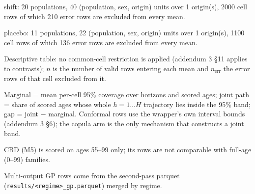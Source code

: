 {\begin{minipage}{\linewidth}
\noindent shift: 20 populations, 40 (population, sex, origin) units over 1 origin(s), 2000 cell rows of which 210 error rows are excluded from every mean.\par
\noindent placebo: 11 populations, 22 (population, sex, origin) units over 1 origin(s), 1100 cell rows of which 136 error rows are excluded from every mean.\par
\noindent Descriptive table: no common-cell restriction is applied (addendum 3 \S11 applies to contrasts); $n$ is the number of valid rows entering each mean and $n_{\mathrm{err}}$ the error rows of that cell excluded from it.\par
\noindent Marginal = mean per-cell 95\% coverage over horizons and scored ages; joint path = share of scored ages whose whole $h=1\ldots H$ trajectory lies inside the 95\% band; gap = joint $-$ marginal. Conformal rows use the wrapper's own interval bounds (addendum 3 \S6); the copula arm is the only mechanism that constructs a joint band.\par
\noindent CBD (M5) is scored on ages 55--99 only; its rows are not comparable with full-age (0--99) families.\par
\noindent Multi-output GP rows come from the second-pass parquet (\texttt{results/<regime>\_gp.parquet}) merged by regime.\par
\end{minipage}}
